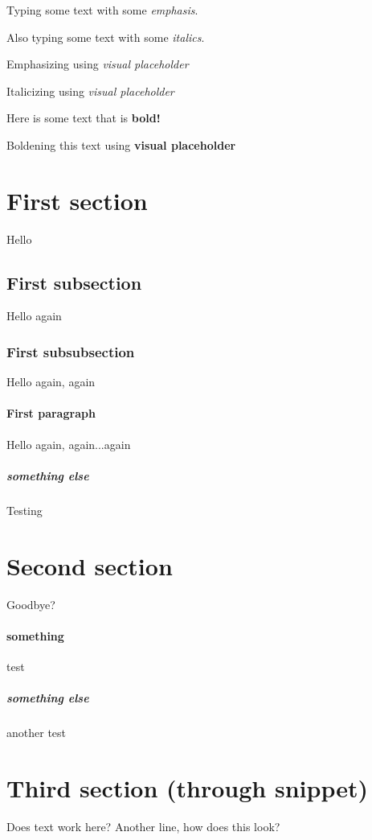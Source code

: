 \documentclass{article}
\begin{document}
Typing some text with some \emph{emphasis}.

Also typing some text with some \textit{italics}.

Emphasizing using \emph{visual placeholder}

Italicizing using \textit{visual placeholder}

Here is some text that is \textbf{bold!}

Boldening this text using \textbf{visual placeholder}

%

\section{First section}
Hello

\subsection{First subsection}
Hello again

\subsubsection{First subsubsection}
Hello again, again

\paragraph{First paragraph}
Hello again, again...again

\subparagraph{something else}
Testing

\section{Second section}
Goodbye?

\paragraph{something}
test
\subparagraph{something else}
another test

\section{Third section (through snippet)}Does text work here?
Another line, how does this look?
\end{document}
